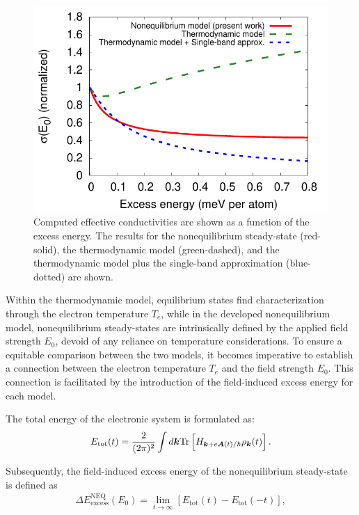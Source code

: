 \begin{figure}[htb]
    \centering
\includegraphics[width=0.8\linewidth]{pic/sigma_thermo.pdf}
\caption{\label{fig:compare} Computed effective conductivities are shown as a function of the excess energy. The results for the nonequilibrium steady-state (red-solid), the thermodynamic model (green-dashed), and the thermodynamic model plus the single-band approximation (blue-dotted) are shown.}
\end{figure}

Within the thermodynamic model, equilibrium states find characterization through the electron
temperature $T_e$, while in the developed nonequilibrium model, nonequilibrium steady-states are
intrinsically defined by the applied field strength $E_0$, devoid of any reliance on temperature
considerations. To ensure a equitable comparison between the two models, it becomes imperative to
establish a connection between the electron temperature $T_e$ and the field strength $E_0$. This connection is facilitated by the introduction of the field-induced excess energy for each model.

The total energy of the electronic system is formulated as:
\begin{eqnarray}
E_{\mathrm{tot}}(t)=\frac{2}{(2\pi)^2} \int d\boldsymbol k \mathrm{Tr}\left[H_{\boldsymbol k+ e\boldsymbol A(t)/\hbar} \rho_{\boldsymbol k}(t)\right].
\label{eqn:totalenergy}
\end{eqnarray}

Subsequently, the field-induced excess energy of the nonequilibrium steady-state is defined as
\begin{eqnarray}
\Delta E^\mathrm{NEQ}_{\mathrm{excess}}(E_0)=\lim_{t\rightarrow \infty} \left [E_{\mathrm{tot}}(t)
-E_{\mathrm{tot}}(-t) \right ],
\label{eq:excess-energy-neq}
\end{eqnarray}

